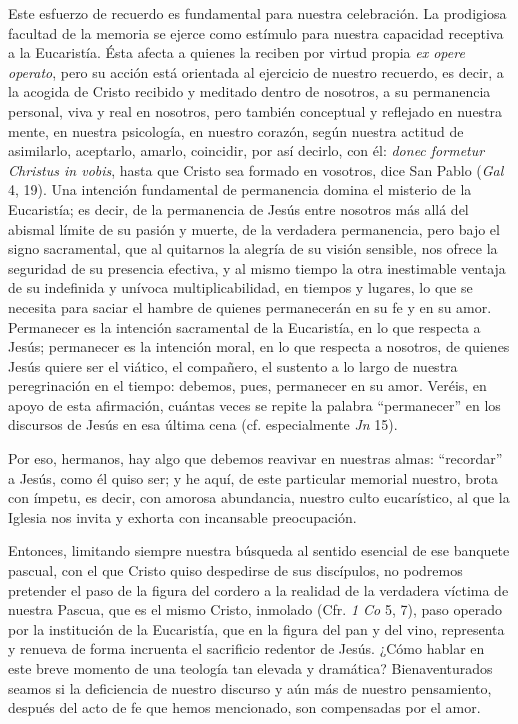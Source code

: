 			\begin{body}Este esfuerzo de recuerdo es fundamental para nuestra celebración. La prodigiosa facultad de la memoria se ejerce como estímulo para nuestra capacidad receptiva a la Eucaristía. Ésta afecta a quienes la reciben por virtud propia \textit{ex opere operato}, pero su acción está orientada al ejercicio de nuestro recuerdo, es decir, a la acogida de Cristo recibido y meditado dentro de nosotros, a su permanencia personal, viva y real en nosotros, pero también conceptual y reflejado en nuestra mente, en nuestra psicología, en nuestro corazón, según nuestra actitud de asimilarlo, aceptarlo, amarlo, coincidir, por así decirlo, con él: \textit{donec formetur Christus in vobis}, hasta que Cristo sea formado en vosotros, dice San Pablo (\textit{Gal} 4, 19). Una intención fundamental de permanencia domina el misterio de la Eucaristía; es decir, de la permanencia de Jesús entre nosotros más allá del abismal límite de su pasión y muerte, de la verdadera permanencia, pero bajo el signo sacramental, que al quitarnos la alegría de su visión sensible, nos ofrece la seguridad de su presencia efectiva, y al mismo tiempo la otra inestimable ventaja de su indefinida y unívoca multiplicabilidad, en tiempos y lugares, lo que se necesita para saciar el hambre de quienes permanecerán en su fe y en su amor. Permanecer es la intención sacramental de la Eucaristía, en lo que respecta a Jesús; permanecer es la intención moral, en lo que respecta a nosotros, de quienes Jesús quiere ser el viático, el compañero, el sustento a lo largo de nuestra peregrinación en el tiempo: debemos, pues, permanecer en su amor. Veréis, en apoyo de esta afirmación, cuántas veces se repite la palabra “permanecer” en los discursos de Jesús en esa última cena (cf. especialmente \textit{Jn} 15).\end{body}
			
			\begin{body}Por eso, hermanos, hay algo que debemos reavivar en nuestras almas: “recordar” a Jesús, como él quiso ser; y he aquí, de este particular memorial nuestro, brota con ímpetu, es decir, con amorosa abundancia, nuestro culto eucarístico, al que la Iglesia nos invita y exhorta con incansable preocupación. \end{body}
			
			\begin{body}Entonces, limitando siempre nuestra búsqueda al sentido esencial de ese banquete pascual, con el que Cristo quiso despedirse de sus discípulos, no podremos pretender el paso de la figura del cordero a la realidad de la verdadera víctima de nuestra Pascua, que es el mismo Cristo, inmolado (Cfr. \textit{1 Co} 5, 7), paso operado por la institución de la Eucaristía, que en la figura del pan y del vino, representa y renueva de forma incruenta el sacrificio redentor de Jesús. ¿Cómo hablar en este breve momento de una teología tan elevada y dramática? Bienaventurados seamos si la deficiencia de nuestro discurso y aún más de nuestro pensamiento, después del acto de fe que hemos mencionado, son compensadas por el amor.\end{body}
			
